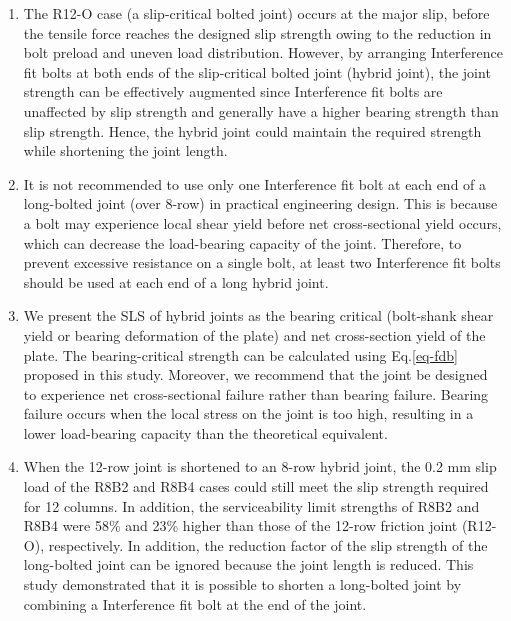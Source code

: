 \begin{enumerate}

\item The R12-O case (a slip-critical bolted joint) occurs at the major slip, before the tensile force reaches the designed slip strength owing to the reduction in bolt preload and uneven load distribution. However, by arranging Interference fit bolts at both ends of the slip-critical bolted joint (hybrid joint), the joint strength can be effectively augmented since Interference fit bolts are unaffected by slip strength and generally have a higher bearing strength than slip strength. Hence, the hybrid joint could maintain the required strength while shortening the joint length.

\item It is not recommended to use only one Interference fit bolt at each end of a long-bolted joint (over 8-row) in practical engineering design. This is because a bolt may experience local shear yield before net cross-sectional yield occurs, which can decrease the load-bearing capacity of the joint. Therefore, to prevent excessive resistance on a single bolt, at least two Interference fit bolts should be used at each end of a long hybrid joint.

\item We present the SLS of hybrid joints as the bearing critical (bolt-shank shear yield or bearing deformation of the plate) and net cross-section yield of the plate. The bearing-critical strength can be calculated using Eq.\ref{eq-fdb} proposed in this study. Moreover, we recommend that the joint be designed to experience net cross-sectional failure rather than bearing failure. Bearing failure occurs when the local stress on the joint is too high, resulting in a lower load-bearing capacity than the theoretical equivalent.

\item When the 12-row joint is shortened to an 8-row hybrid joint, the 0.2 mm slip load of the R8B2 and R8B4 cases could still meet the slip strength required for 12 columns. In addition, the serviceability limit strengths of R8B2 and R8B4 were 58\% and 23\% higher than those of the 12-row friction joint (R12-O), respectively. In addition, the reduction factor of the slip strength of the long-bolted joint can be ignored because the joint length is reduced. This study demonstrated that it is possible to shorten a long-bolted joint by combining a Interference fit bolt at the end of the joint. 

\end{enumerate}


